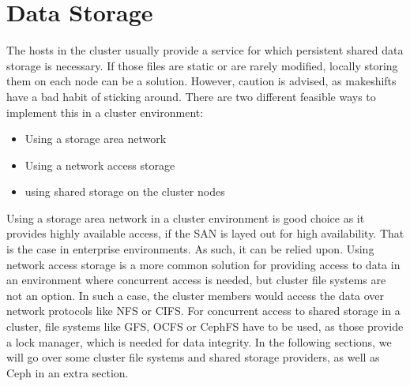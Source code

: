 



\section{Data Storage}

The hosts in the cluster usually provide a service for which persistent shared data storage is necessary.
If those files are static or are rarely modified, locally storing them on each node can be a solution. However, caution is advised, as makeshifts have a bad habit of sticking around.
There are two different feasible ways to implement this in a cluster environment:
\begin{itemize}
\item Using a storage area network
\item Using a network access storage
\item using shared storage on the cluster nodes
\end{itemize}
Using a storage area network in a cluster environment is good choice as it provides highly available access, if the \ac{SAN} is layed out for high availability. That is the case in enterprise environments. As such, it can be relied upon.
Using network access storage is a more common solution for providing access to data in an environment where concurrent access is needed, but cluster file systems are not an option. In such a case, the cluster members would access the data over network protocols like \ac{NFS} or \ac{CIFS}. For concurrent access to shared storage in a cluster, file systems like \ac{GFS}, \ac{OCFS} or CephFS have to be used, as those provide a lock manager, which is needed for data integrity. In the following sections, we will go over some cluster file systems and shared storage providers, as well as Ceph in an extra section.
